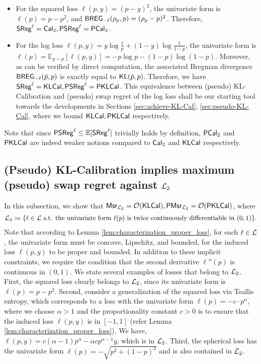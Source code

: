 \begin{itemize}[leftmargin=*]
\item For the squared loss $\ell(p, y) = (p - y) ^ {2}$, the univariate form is $\ell(p) = p - p ^ {2}$, and $\breg_{-\ell}(\rho_{p}, p) = (\rho_{p} - p) ^ {2}$. Therefore, $\sreg^{\ell} = \cal_{2}, \psreg^{\ell} = \pcal_{2}$.
\item For the log loss $\ell(p, y) = y\log\frac{1}{p} + (1-y)\log\frac{1}{1-p}$, the univariate form is $\ell(p) = \mathbb{E}_{y \sim p} [\ell(p, y)] = -p \log p - (1 - p) \log (1 - p)$. Moreover, as can be verified by direct computation, the associated Bregman divergence $\breg_{-\ell}(\hat{p}, p)$ is exactly equal to $\KL(\hat{p}, p)$. Therefore, we have $\sreg^{\ell} = \kcal, \psreg^{\ell} = \pkcal$.
This equivalence between (pseudo) KL-Calibration and (pseudo) swap regret of the log loss shall be our starting tool towards the developments in Sections \ref{sec:achieve-KL-Cal}, \ref{sec:pseudo-KL-Cal}, where we bound $\kcal, \pkcal$ respectively.
\end{itemize}
Note that since $\psreg^\ell \leq \mathbb{E}[\sreg^\ell]$ trivially holds by definition, $\pcal_{2}$ and $\pkcal$ are indeed weaker notions compared to $\cal_2$ and $\kcal$ respectively.


\subsection{(Pseudo) KL-Calibration implies  maximum (pseudo) swap regret against $\cL_{2}$} \label{subsec:KL-bounds-L-2}
In this subsection, we show that $\msr_{\cL_{2}} = \cO(\kcal), \mpsr_{\cL_{2}} = \cO(\pkcal)$, where \begin{align*}
    \cL_{2} \coloneqq \{\ell \in \cL \text{ s.t. the univariate form } \ell(p) \text{ is twice continuously differentiable in } (0, 1)\}.
\end{align*}
 Note that according to Lemma \ref{lem:characterization_proper_loss}, for each $\ell \in \cL$, the univariate form must be concave, Lipschitz, and bounded, for the induced loss $\ell(p, y)$ to be proper and bounded. In addition to these implicit constraints, we require the condition that the second derivative $\ell''(p)$ is continuous in $(0, 1)$. 
 We state several examples of losses that belong to $\cL_{2}$. First, the squared loss clearly belongs to $\cL_{2}$, since its univariate form is $\ell(p) = p - p ^ {2}$.
 Second, consider a generalization of the squared loss via Tsallis entropy, which corresponds to a loss with the univariate form $\ell(p) =  -c \cdot p ^ {\alpha}$, where we choose $\alpha > 1$ and the proportionality constant $c > 0$ is to ensure that the induced loss $\ell(p, y)$ is in $[-1, 1]$ (refer Lemma \ref{lem:characterization_proper_loss}). We have, $\ell(p, y) = c (\alpha - 1) p ^ {\alpha} - \alpha c p ^ {\alpha - 1} y$, which is in $\cL_{2}$.
 Third, the spherical loss has the univariate form $\ell(p) = -\sqrt{p ^ {2} + (1 - p) ^ {2}}$ and is also contained in $\cL_{2}$. 
 
